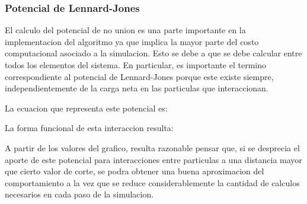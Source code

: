 \documentclass[a4paper,10pt]{report}
\begin{document}
\subsubsection{Potencial de Lennard-Jones}


El calculo del potencial de no union es una parte importante en la implementacion del algoritmo ya que implica la mayor parte del costo computacional asociado a la simulacion. 
Esto se debe a que se debe calcular entre todos los elementos del sistema. 
En particular, es importante el termino correspondiente al potencial de Lennard-Jones porque este existe siempre, independientemente de la carga neta en las particulas que interaccionan.

La ecuacion que representa este potencial es:



La forma funcional de esta interaccion resulta: 

A partir de los valores del grafico, resulta razonable pensar que, si se desprecia el aporte de este potencial para interacciones entre particulas a una distancia mayor que cierto valor de corte, se podra obtener una buena aproximacion del comportamiento a la vez que se reduce considerablemente la cantidad de calculos necesarios en cada paso de la simulacion.

\end{document}
